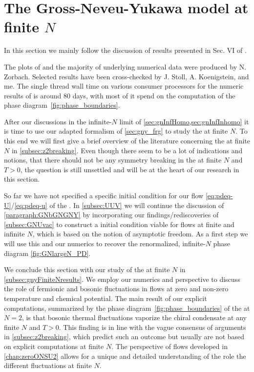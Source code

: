 \FloatBarrier
\section{The Gross-Neveu-Yukawa model at finite \texorpdfstring{$N$}{N}}\label{sec:gnyFiniteN}
\begin{disclaimer}
	In this section we mainly follow the discussion of results presented in Sec. VI of .
	
	The plots of  and the majority of underlying numerical data were produced by N. Zorbach.
	Selected results have been cross-checked by J. Stoll, A. Koenigstein, and me.
	The single thread wall time on various consumer processors for the numeric results of  is around 80 days, with most of it spend on the 
	computation of the phase diagram~\ref{fig:phase_boundaries}.
\end{disclaimer}
After our discussions in the infinite-$N$ limit of \cref{sec:gnInfHomo,sec:gnInfInhomo} it is time to use our adapted \cfd{} \frg{} formalism of \cref{sec:gny_frg} to study the \gnym{} at finite $N$.
To this end we will first give a brief overview of the literature concerning the \gnyBm{} at finite $N$ in \cref{subsec:z2breaking}.
Even though there seem to be a lot of indications and notions, that there should not be any symmetry breaking in the \gnyBm{} at finite $N$ and $T>0$, the question is still unsettled and will be at the heart of our research in this section.

So far we have not specified a specific \uv{} initial condition for our \lpa{} flow \cref{eq:pdeq-U}/\eqref{eq:pdeq-u} of the \gnym{}.
In \cref{subsec:UUV} we will continue the discussion of \cref{paragraph:GNbGNGNY} by incorporating our findings/rediscoveries of \cref{subsec:GNUvac} to construct a \uv{} initial condition viable for flows at finite and infinite $N$, which is based on the notion of asymptotic freedom.
As a first step we will use this \ic{} and our \cfd{} numerics to recover the renormalized, infinite-$N$ phase diagram \cref{fig:GNlargeN_PD}.

We conclude this section with our \frg{} study of the \gnym{} at finite $N$ in \cref{subsec:gnyFiniteNresults}.
We employ our \cfd{} numerics and perspective to discuss the role of fermionic and bosonic fluctuations in \frg{} flows at zero and non-zero temperature and chemical potential.
The main result of our explicit computations, summarized by the phase diagram~\ref{fig:phase_boundaries} of the \gnym{} at $N=2$, is that bosonic thermal fluctuations vaporize the chiral condensate at any finite $N$ and $T>0$.
This finding is in line with the vague consensus of arguments in \cref{subsec:z2breaking}, which predict such an outcome but usually are not based on explicit computations at finite $N$.
The \cfd{} perspective of \frg{} flows developed in \cref{chap:zeroONSU2} allows for a unique and detailed understanding of the role the different fluctuations at finite $N$.

